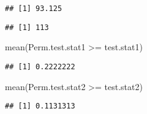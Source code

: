 \documentclass[
]{article}
\newenvironment{Shaded}{\begin{snugshade}}{\end{snugshade}}
\newcommand{\FunctionTok}[1]{\textcolor[rgb]{0.00,0.00,0.00}{#1}}
\newcommand{\NormalTok}[1]{#1}
\newcommand{\SpecialCharTok}[1]{\textcolor[rgb]{0.00,0.00,0.00}{#1}}
\begin{document}
\begin{verbatim}
## [1] 93.125
\end{verbatim}

\begin{verbatim}
## [1] 113
\end{verbatim}

\begin{Shaded}
\begin{Highlighting}[]
\FunctionTok{mean}\NormalTok{(Perm.test.stat1 }\SpecialCharTok{\textgreater{}=}\NormalTok{ test.stat1)}
\end{Highlighting}
\end{Shaded}

\begin{verbatim}
## [1] 0.2222222
\end{verbatim}

\begin{Shaded}
\begin{Highlighting}[]
\FunctionTok{mean}\NormalTok{(Perm.test.stat2 }\SpecialCharTok{\textgreater{}=}\NormalTok{ test.stat2)}
\end{Highlighting}
\end{Shaded}

\begin{verbatim}
## [1] 0.1131313
\end{verbatim}
\end{document}
